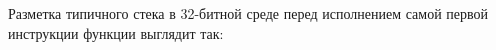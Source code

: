 
Разметка типичного стека в 32-битной среде
перед исполнением самой первой инструкции функции выглядит так:




